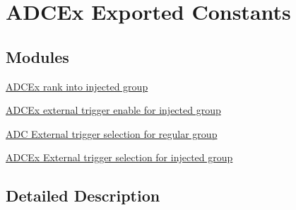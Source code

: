 \hypertarget{group___a_d_c_ex___exported___constants}{}\section{A\+D\+C\+Ex Exported Constants}
\label{group___a_d_c_ex___exported___constants}
\subsection*{Modules}
\begin{DoxyCompactItemize}
\item 
\hyperlink{group___a_d_c_ex__injected__rank}{A\+D\+C\+Ex rank into injected group}
\item 
\hyperlink{group___a_d_c_ex___external__trigger__edge___injected}{A\+D\+C\+Ex external trigger enable for injected group}
\item 
\hyperlink{group___a_d_c___external__trigger__source___regular}{A\+D\+C External trigger selection for regular group}
\item 
\hyperlink{group___a_d_c_ex___external__trigger__source___injected}{A\+D\+C\+Ex External trigger selection for injected group}
\end{DoxyCompactItemize}


\subsection{Detailed Description}
